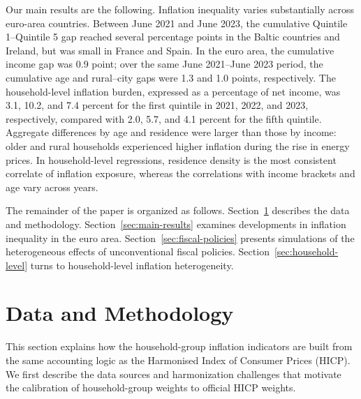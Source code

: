 \documentclass[11pt]{article}
\begin{document}

Our main results are the following. Inflation inequality varies substantially across euro-area
countries. Between June 2021 and June 2023, the cumulative Quintile 1--Quintile 5 gap 
reached several percentage points in the Baltic countries and Ireland, but was small in
France and Spain. In the euro area, the cumulative income gap was 0.9 point; over the same June
2021--June 2023 period, the cumulative age and rural--city gaps were 1.3 and 1.0 points, respectively.
The household-level inflation burden, expressed as a percentage of net income, was 3.1, 10.2, and
7.4 percent for the first quintile in 2021, 2022, and 2023, respectively, compared with 2.0, 5.7,
and 4.1 percent for the fifth quintile.
Aggregate differences by age and residence were larger than those by income: older and rural households experienced
higher inflation during the rise in energy prices. In household-level regressions, residence density is the most consistent correlate of
inflation exposure, whereas the correlations with income brackets and age vary across years.

The remainder of the paper is organized as follows. Section~\ref{sec:data-methodology} describes the
data and methodology. Section~\ref{sec:main-results} examines developments in inflation inequality
in the euro area. Section~\ref{sec:fiscal-policies} presents simulations of the heterogeneous
effects of unconventional fiscal policies. Section~\ref{sec:household-level} turns to
household-level inflation heterogeneity.


\section{Data and Methodology}
\label{sec:data-methodology}

This section explains how the household-group inflation indicators are built from the same
accounting logic as the Harmonised Index of Consumer Prices (HICP). We first describe the data sources 
and harmonization challenges that motivate the
calibration of household-group weights to official HICP weights.
\end{document}
